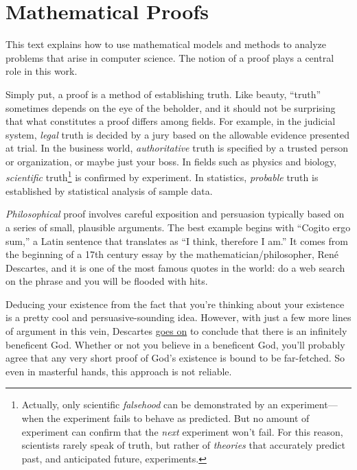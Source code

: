 
\section*{Mathematical Proofs}

This text explains how to use mathematical models and methods to
analyze problems that arise in computer science.  The notion of a
proof plays a central role in this work.

Simply put, a proof is a method of establishing truth.  Like beauty,
``truth'' sometimes depends on the eye of the beholder, and
it should not be surprising that what constitutes a proof differs
among fields.  For example, in the judicial system, \emph{legal} truth
is decided by a jury based on the allowable evidence presented at
trial.  In the business world, \emph{authoritative} truth is specified
by a trusted person or organization, or maybe just your boss.  In
fields such as physics and biology, \emph{scientific}
truth\footnote{Actually, only scientific
\emph{falsehood} can be demonstrated by an experiment---when
the experiment fails to behave as predicted.  But no amount of
experiment can confirm that the \emph{next} experiment won't fail.
For this reason, scientists rarely speak of truth, but rather
of \emph{theories} that accurately predict past, and anticipated
future, experiments.} is confirmed by experiment.  In
statistics, \emph{probable} truth is established by statistical
analysis of sample data.

\emph{Philosophical} proof involves careful exposition and
persuasion typically based on a series of small, plausible arguments.
The best example begins with ``Cogito ergo sum,'' a Latin sentence
that translates as ``I think, therefore I am.''  It comes from the
beginning of a 17th century essay by the mathematician/philosopher,
Ren\'e Descartes, and it is one of the most famous quotes in the
world: do a web search on the phrase and you will be flooded with
hits.

Deducing your existence from the fact that you're thinking about your
existence is a pretty cool and persuasive-sounding idea.
However, with just a few more lines of argument in this vein, Descartes
\href{http://www.btinternet.com/~glynhughes/squashed/descartes.htm}{goes
  on} to conclude that there is an infinitely beneficent God.  Whether
or not you believe in a beneficent God, you'll probably agree that any
very short proof of God's existence is bound to be far-fetched.  So even
in masterful hands, this approach is not reliable.

